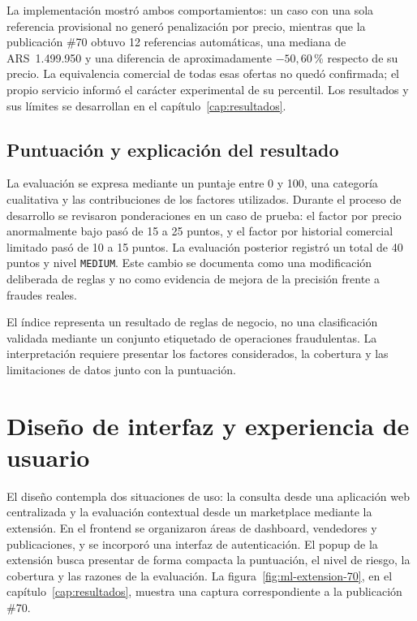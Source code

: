 La implementación mostró ambos comportamientos: un caso con una sola referencia provisional no generó penalización por precio, mientras que la publicación \#70 obtuvo 12 referencias automáticas, una mediana de ARS~1.499.950 y una diferencia de aproximadamente $-50{,}60$\,\% respecto de su precio. La equivalencia comercial de todas esas ofertas no quedó confirmada; el propio servicio informó el carácter experimental de su percentil. Los resultados y sus límites se desarrollan en el capítulo~\ref{cap:resultados}.

\subsection{Puntuación y explicación del resultado}\label{subsec:ml-interpretacion-riesgo}

La evaluación se expresa mediante un puntaje entre 0 y 100, una categoría cualitativa y las contribuciones de los factores utilizados. Durante el proceso de desarrollo se revisaron ponderaciones en un caso de prueba: el factor por precio anormalmente bajo pasó de 15 a 25 puntos, y el factor por historial comercial limitado pasó de 10 a 15 puntos. La evaluación posterior registró un total de 40 puntos y nivel \texttt{MEDIUM}. Este cambio se documenta como una modificación deliberada de reglas y no como evidencia de mejora de la precisión frente a fraudes reales.

El índice representa un resultado de reglas de negocio, no una clasificación validada mediante un conjunto etiquetado de operaciones fraudulentas. La interpretación requiere presentar los factores considerados, la cobertura y las limitaciones de datos junto con la puntuación.

\section{Diseño de interfaz y experiencia de usuario}\label{sec:ml-ux}

El diseño contempla dos situaciones de uso: la consulta desde una aplicación web centralizada y la evaluación contextual desde un marketplace mediante la extensión. En el frontend se organizaron áreas de dashboard, vendedores y publicaciones, y se incorporó una interfaz de autenticación. El popup de la extensión busca presentar de forma compacta la puntuación, el nivel de riesgo, la cobertura y las razones de la evaluación. La figura~\ref{fig:ml-extension-70}, en el capítulo~\ref{cap:resultados}, muestra una captura correspondiente a la publicación \#70.

